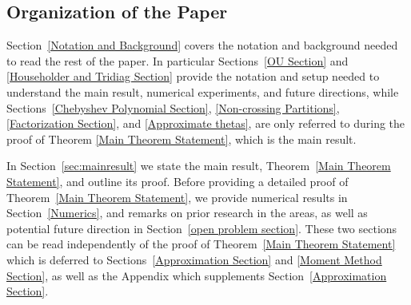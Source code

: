 \documentclass{amsart}
\numberwithin{equation}{section}
\begin{document}



\subsection{Organization of the Paper}

Section~\ref{Notation and Background} covers the notation and background needed to read the rest of the paper. In particular Sections~\ref{OU Section} and \ref{Householder and Tridiag Section} provide the notation and setup needed to understand the main result, numerical experiments, and future directions, while Sections~\ref{Chebyshev Polynomial Section}, \ref{Non-crossing Partitions}, \ref{Factorization Section},  and \ref{Approximate thetas}, are only referred to during the proof of Theorem \ref{Main Theorem Statement}, which is the main result. 


In Section~\ref{sec:mainresult} we state the main result, Theorem~\ref{Main Theorem Statement}, and outline its proof. Before providing a detailed proof of Theorem~\ref{Main Theorem Statement}, we provide numerical results in Section~\ref{Numerics}, and remarks on prior research in the areas, as well as potential future direction in Section~\ref{open problem section}. These two sections can be read independently of the proof of Theorem~\ref{Main Theorem Statement} which is deferred to Sections~\ref{Approximation Section} and \ref{Moment Method Section}, as well as the Appendix which supplements Section~\ref{Approximation Section}.
\end{document}
